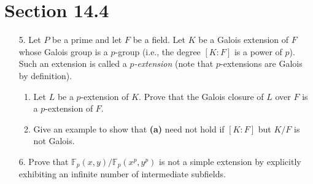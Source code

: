 \documentclass[12pt,leqno]{article}
\theoremstyle{definition}
\newcommand{\F}{\mathbb{F}}
\newcommand{\+}{\oplus}
\begin{document}
\section*{Section 14.4}
  \begin{enumerate}
   \item [5.] Let $P$ be a prime and let $F$ be a field. Let $K$ be a Galois extension of $F$ whose Galois group is a $p$-group (i.e., the degree $[K:F]$ is a power of $p$). Such an extension is called a $p$\textit{-extension} (note that $p$-extensions are Galois by definition).
    \begin{enumerate}
     \item Let $L$ be a $p$-extension of $K$. Prove that the Galois closure of $L$ over $F$ is a $p$-extension of $F$.
     \item Give an example to show that \textbf{(a)} need not hold if $[K:F]$ but $K/F$ is not Galois. 
    \end{enumerate}
  \item [6.] Prove that $\F_p(x,y)/\F_p(x^p,y^p)$ is not a simple extension by explicitly exhibiting an infinite number of intermediate subfields.
  \end{enumerate}
\end{document}
